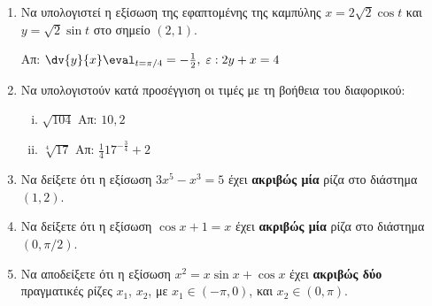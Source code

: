 \documentclass[a4paper,table]{report}
\begin{document}
\begin{enumerate}
  \item Να υπολογιστεί η εξίσωση της εφαπτομένης της καμπύλης 
    $ x=2 \sqrt{2} \cos{t} $ και $ y= \sqrt{2} \sin{t} $ στο σημείο $ (2,1) $.

    \hfill Απ: $ \dv{y}{x} \eval_{t= \pi /4} = - \frac{1}{2}, \; \varepsilon: 2y+x=4 $ 

  \item Να υπολογιστούν κατά προσέγγιση οι τιμές με τη βοήθεια του διαφορικού:
    \begin{enumerate}[i)]
      \item $\sqrt{104}$ \hfill Απ: $10,2$
      \item $\sqrt[4]{17}$ \hfill Απ: $\frac{1}{4}17^{-\frac{3}{4}}+2$
    \end{enumerate}


  \item Να δείξετε ότι η εξίσωση $ 3x^{5}-x^{3}=5 $ έχει \textbf{ακριβώς μία} 
    ρίζα στο διάστημα $ (1,2) $.
  \item Να δείξετε ότι η εξίσωση $ \cos{x} + 1 = x $ έχει \textbf{ακριβώς μία} 
    ρίζα στο διάστημα $ (0, \pi/2) $. 

  \item Να αποδείξετε ότι η εξίσωση 
    $ x^{2} = x \sin{x} + \cos{x} $ έχει \textbf{ακριβώς δύο} πραγματικές ρίζες 
    $ x_{1} $, $ x_{2} $, με $ x_{1} \in (-\pi, 0) $, και $x_{2} \in (0, \pi) $.


\end{enumerate}
\end{document}
